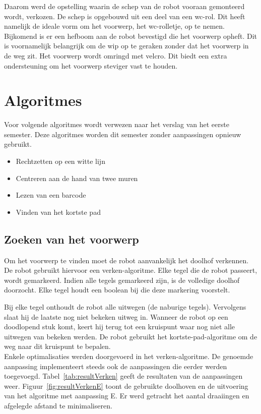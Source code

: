\documentclass[tt1]{penoverslag}
\begin{document}
Daarom werd de opstelling waarin de schep van de robot vooraan gemonteerd wordt, verkozen. De schep is opgebouwd uit een deel van een wc-rol. Dit heeft namelijk de ideale vorm om het voorwerp, het wc-rolletje, op te nemen. Bijkomend is er een hefboom aan de robot bevestigd die het voorwerp opheft. Dit is voornamelijk belangrijk om de wip op te geraken zonder dat het voorwerp in de weg zit.
Het voorwerp wordt omringd met velcro. Dit biedt een extra ondersteuning om het voorwerp steviger vast te houden. 




\section{Algoritmes}
Voor volgende algoritmes wordt verwezen naar het verslag van het eerste semester. Deze algoritmes worden dit semester zonder aanpassingen opnieuw gebruikt.
\begin{itemize}
	\item Rechtzetten op een witte lijn
	\item Centreren aan de hand van twee muren
	\item Lezen van een barcode
	\item Vinden van het kortste pad
\end{itemize}

\subsection{Zoeken van het voorwerp} %
\label{ssec:algoZoek}
Om het voorwerp te vinden moet de robot aanvankelijk het doolhof verkennen. De robot gebruikt hiervoor een verken-algoritme. Elke tegel die de robot passeert, wordt gemarkeerd. Indien alle tegels gemarkeerd zijn, is de volledige doolhof doorzocht. Elke tegel houdt een boolean bij die deze markering voorstelt.

Bij elke tegel onthoudt de robot alle uitwegen (de naburige tegels). Vervolgens slaat hij de laatste nog niet bekeken uitweg in. Wanneer de robot op een doodlopend stuk komt, keert hij terug tot een kruispunt waar nog niet alle uitwegen van bekeken werden. De robot gebruikt het kortste-pad-algoritme om de weg naar dit kruispunt te bepalen.\\

Enkele optimalisaties werden doorgevoerd in het verken-algoritme. De genoemde aanpassing implementeert steeds ook de aanpassingen die eerder werden toegevoegd. Tabel~\ref{tab:resultVerken} geeft de resultaten van de aanpassingen weer. Figuur~\ref{fig:resultVerkenE} toont de gebruikte doolhoven en de uitvoering van het algoritme met aanpassing E. Er werd getracht het aantal draaiingen en afgelegde afstand te minimaliseren.
\end{document}
